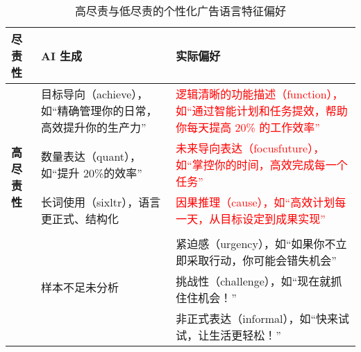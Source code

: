 \begin{table}[H]
    \centering
    \caption{\label{tab:study3_conscientiousness_comparison} 高尽责与低尽责的个性化广告语言特征偏好}
    {\tablesongti %
    \renewcommand{\arraystretch}{1.5} %
    \begin{tabularx}{\linewidth}{l X X} %
        \toprule
        \textbf{尽责性} & \textbf{AI 生成} & \textbf{实际偏好} \\
        \midrule
        \multirow{5}{*}{\textbf{高尽责性}} 
        & 目标导向（achieve），如“精确管理你的日常，高效提升你的生产力” & \textcolor{red}{逻辑清晰的功能描述（function），如“通过智能计划和任务提效，帮助你每天提高 20\% 的工作效率”} \\
        & 数量表达（quant），如“提升 20\%的效率” & \textcolor{red}{未来导向表达（focusfuture），如“掌控你的时间，高效完成每一个任务”} \\
        & 长词使用（sixltr），语言更正式、结构化 & \textcolor{red}{因果推理（cause），如“高效计划每一天，从目标设定到成果实现”}\\
        \midrule
        \multirow{5}{*}{\textbf{低尽责性}} 
        & \multirow{5}{*}{样本不足未分析} \\
        &  & 紧迫感（urgency），如“如果你不立即采取行动，你可能会错失机会”\\
        &  & 挑战性（challenge），如“现在就抓住住机会！”\\
        &  & 非正式表达（informal），如“快来试试，让生活更轻松！”\\
        \bottomrule
    \end{tabularx}
    }
\end{table}


